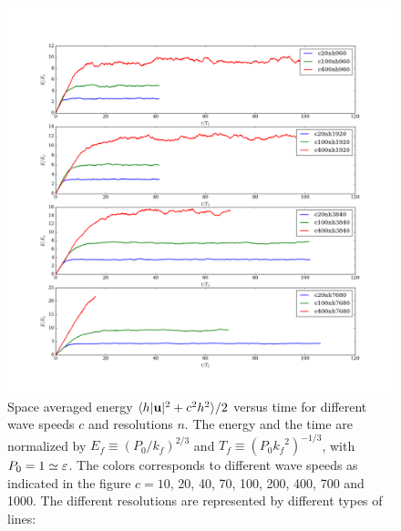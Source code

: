 \begin{figure}
\centerline{\includegraphics[width=13cm]{../Pyfig/fig_1}}
\caption{Space averaged energy 
$\langle h|\textbf{u}|^2 + c^2 h^2 \rangle/2$ versus time 
for different wave speeds $c$ and resolutions $n$.
%
The energy and the time are normalized by 
$E_f\equiv (P_0/k_f)^{2/3}$ and $T_f\equiv (P_0 {k_f}^2)^{-1/3}$,
with $P_0 = 1 \simeq \varepsilon$.
%
The colors corresponds to different wave speeds as indicated in the figure
$c= 10$, 20, 40, 70, 100, 200, 400, 700 and 1000.
%
The different resolutions are represented by different types of lines:
}
\label{fig_Evstime}
\end{figure}






